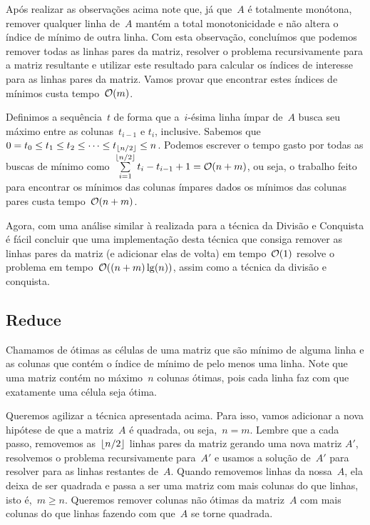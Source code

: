 Após realizar as observações acima note que, já que~$A$ é totalmente monótona, remover qualquer linha de~$A$ mantém a total monotonicidade e não altera o índice de mínimo de outra linha. Com esta observação, concluímos que podemos remover todas as linhas pares da matriz, resolver o problema recursivamente para a matriz resultante e utilizar este resultado para calcular os índices de interesse para as linhas pares da matriz. Vamos provar que encontrar estes índices de mínimos custa tempo~$\mathcal{O}(m)$. 

Definimos a sequência~$t$ de forma que a~$i$-ésima linha ímpar de~$A$ busca seu máximo entre as colunas~$t_{i-1}$ e $t_{i}$, inclusive. Sabemos que~$0 = t_0 \leq t_1 \leq t_2 \leq \dots \leq t_{\lfloor n/2\rfloor} \leq n$. Podemos escrever o tempo gasto por todas as buscas de mínimo como~$\sum \limits_{i=1}^{\lfloor n/2\rfloor} t_i - t_{i-1} + 1 = \mathcal{O}(n+m)$, ou seja, o trabalho feito para encontrar os mínimos das colunas ímpares dados os mínimos das colunas pares custa tempo~$\mathcal{O}(n+m)$.

Agora, com uma análise similar à realizada para a técnica da Divisão e Conquista é fácil concluir que uma implementação desta técnica que consiga remover as linhas pares da matriz (e adicionar elas de volta) em tempo~$\mathcal{O}(1)$ resolve o problema em tempo~$\mathcal{O}((n+m)\lg(n))$, assim como a técnica da divisão e conquista.


\subsection{Reduce} \label{SMAWK:reduce}
Chamamos de ótimas as células de uma matriz que são mínimo de alguma linha e as colunas que contém o índice de mínimo de pelo menos uma linha. Note que uma matriz contém no máximo~$n$ colunas ótimas, pois cada linha faz com que exatamente uma célula seja ótima. 

Queremos agilizar a técnica apresentada acima. Para isso, vamos adicionar a nova hipótese de que a matriz~$A$ é quadrada, ou seja,~$n = m$. Lembre que a cada passo, removemos as~$\lfloor n/2\rfloor$ linhas pares da matriz gerando uma nova matriz $A'$, resolvemos o problema recursivamente para~$A'$ e usamos a solução de~$A'$ para resolver para as linhas restantes de~$A$. Quando removemos linhas da nossa~$A$, ela deixa de ser quadrada e passa a ser uma matriz com mais colunas do que linhas, isto é,~$m \geq n$. Queremos remover colunas não ótimas da matriz~$A$ com mais colunas do que linhas fazendo com que~$A$ se torne quadrada.  

